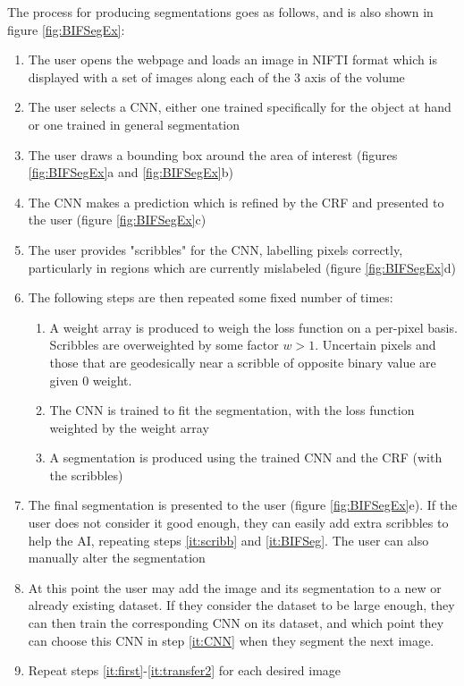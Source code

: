 The process for producing segmentations goes as follows, and is also shown in figure \ref{fig:BIFSegEx}:
\begin{enumerate}
\item \label{it:first} The user opens the webpage and loads an image in NIFTI format which is displayed with a set of images along each of the 3 axis of the volume
\item \label{it:CNN} The user selects a CNN, either one trained specifically for the object at hand or one trained in general segmentation
\item The user draws a bounding box around the area of interest (figures \ref{fig:BIFSegEx}a and \ref{fig:BIFSegEx}b)
\item The CNN makes a prediction which is refined by the CRF and presented to the user (figure \ref{fig:BIFSegEx}c)
\item \label{it:scribb} The user provides "scribbles" for the CNN, labelling pixels correctly, particularly in regions which are currently mislabeled (figure \ref{fig:BIFSegEx}d)
\item \label{it:BIFSeg} The following steps are then repeated some fixed number of times:
\begin{enumerate}
\item A weight array is produced to weigh the loss function on a per-pixel basis. Scribbles are overweighted by some factor $w>1$. Uncertain pixels and those that are geodesically near a scribble of opposite binary value are given 0 weight. 
\item The CNN is trained to fit the segmentation, with the loss function weighted by the weight array
\item A segmentation is produced using the trained CNN and the CRF (with the scribbles)
\end{enumerate}
\item \label{it:fin} The final segmentation is presented to the user (figure \ref{fig:BIFSegEx}e). If the user does not consider it good enough, they can easily add extra scribbles to help the AI, repeating steps \ref{it:scribb} and \ref{it:BIFSeg}. The user can also manually alter the segmentation
\item \label{it:transfer2} At this point the user may add the image and its segmentation to a new or already existing dataset. If they consider the dataset to be large enough, they can then train the corresponding CNN on its dataset, and which point they can choose this CNN in step \ref{it:CNN} when they segment the next image.
\item Repeat steps \ref{it:first}-\ref{it:transfer2} for each desired image
\end{enumerate}




